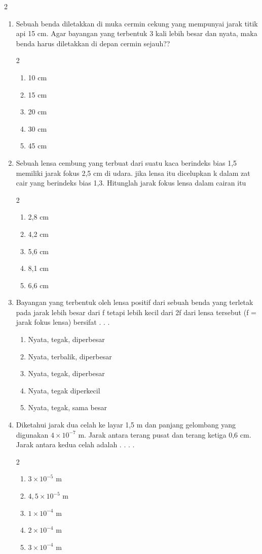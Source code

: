 \documentclass[10pt,a4paper]{extarticle}
\newcommand*\pilgan[1]{
\begin{enumerate}[label=\Alph*., itemsep=0pt,topsep=0pt,leftmargin=*,align=Center] #1 
\end{enumerate}}
\newcommand{\pilgani}[1]{                            \vspace{-0.3cm}\begin{multicols}{2}
 \begin{enumerate}[label=\Alph*., itemsep=0pt,topsep=0pt,leftmargin=*,align=Center]#1                     \end{enumerate}
 \phantom{ini cuma sapi, wedus, dan ayam}
 \end{multicols}}
\begin{document}
\begin{multicols*}{2}
\begin{enumerate}
\item Sebuah benda diletakkan di muka cermin cekung yang mempunyai jarak titik api 15 cm. Agar bayangan yang terbentuk 3 kali lebih besar dan nyata, maka benda harus diletakkan di depan cermin sejauh??
\pilgani{
	\item 10 cm
	\item 15 cm
	\item 20 cm
	\item 30 cm
	\item 45 cm
}
\vspace{2cm}

\item Sebuah lensa cembung yang terbuat dari suatu kaca berindeks bias 1,5 memiliki jarak fokus 2,5 cm di udara. jika lensa itu dicelupkan k dalam zat cair yang berindeks bias 1,3. Hitunglah jarak fokus lensa dalam cairan itu
\pilgani{
	\item 2,8 cm
	\item 4,2 cm
	\item 5,6 cm
	\item 8,1 cm
	\item 6,6 cm
}
\vspace{4.2cm}

\item Bayangan yang terbentuk oleh lensa positif dari sebuah benda yang terletak pada jarak lebih besar dari f tetapi lebih kecil dari 2f dari lensa tersebut (f = jarak fokus lensa) bersifat . . . 
\pilgan{
\item Nyata, tegak, diperbesar
\item Nyata, terbalik, diperbesar
\item Nyata, tegak, diperbesar
\item Nyata, tegak diperkecil
\item Nyata, tegak, sama besar
}
 
 \vspace{4.2cm}

\item Diketahui jarak dua celah ke layar 1,5 m dan panjang gelombang yang digunakan $4\times10^{-7}$ m.
Jarak antara terang pusat dan terang ketiga 0,6 cm. Jarak antara kedua celah adalah . . . .
\pilgani{
\item $3\times 10^{-5}$ m
\item $4,5\times 10^{-5}$ m
\item $1\times 10^{-4}$ m
\item $2\times 10^{-4}$ m
\item $3\times 10^{-4}$ m
}
\vspace{4.2cm}


\end{enumerate}
\end{multicols*}
\end{document}
